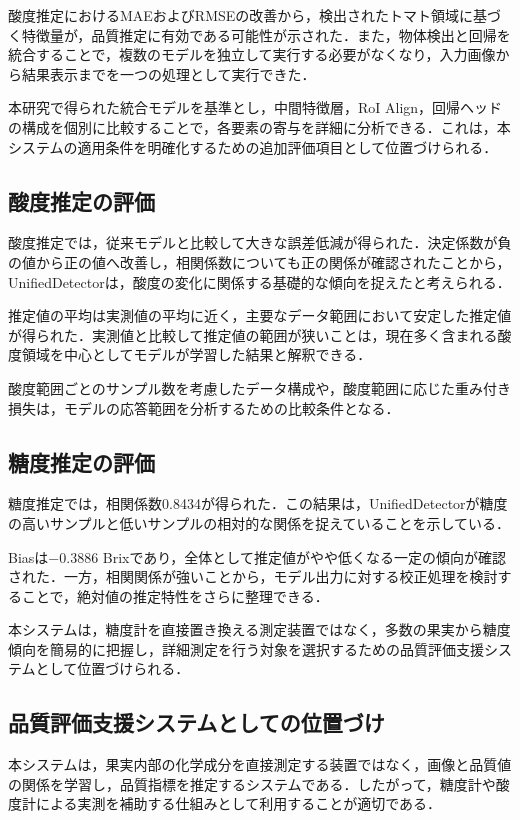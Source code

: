 \documentclass[authorproof,JRM,paper]{fujipressarticle}
\begin{document}
酸度推定におけるMAEおよびRMSEの改善から，検出されたトマト領域に基づく特徴量が，品質推定に有効である可能性が示された．また，物体検出と回帰を統合することで，複数のモデルを独立して実行する必要がなくなり，入力画像から結果表示までを一つの処理として実行できた．

本研究で得られた統合モデルを基準とし，中間特徴層，RoI Align，回帰ヘッドの構成を個別に比較することで，各要素の寄与を詳細に分析できる．これは，本システムの適用条件を明確化するための追加評価項目として位置づけられる．

\subsection{酸度推定の評価}

酸度推定では，従来モデルと比較して大きな誤差低減が得られた．決定係数が負の値から正の値へ改善し，相関係数についても正の関係が確認されたことから，UnifiedDetectorは，酸度の変化に関係する基礎的な傾向を捉えたと考えられる．

推定値の平均は実測値の平均に近く，主要なデータ範囲において安定した推定値が得られた．実測値と比較して推定値の範囲が狭いことは，現在多く含まれる酸度領域を中心としてモデルが学習した結果と解釈できる．

酸度範囲ごとのサンプル数を考慮したデータ構成や，酸度範囲に応じた重み付き損失は，モデルの応答範囲を分析するための比較条件となる．

\subsection{糖度推定の評価}

糖度推定では，相関係数0.8434が得られた．この結果は，UnifiedDetectorが糖度の高いサンプルと低いサンプルの相対的な関係を捉えていることを示している．

Biasは$-0.3886$ Brixであり，全体として推定値がやや低くなる一定の傾向が確認された．一方，相関関係が強いことから，モデル出力に対する校正処理を検討することで，絶対値の推定特性をさらに整理できる．

本システムは，糖度計を直接置き換える測定装置ではなく，多数の果実から糖度傾向を簡易的に把握し，詳細測定を行う対象を選択するための品質評価支援システムとして位置づけられる．

\subsection{品質評価支援システムとしての位置づけ}

本システムは，果実内部の化学成分を直接測定する装置ではなく，画像と品質値の関係を学習し，品質指標を推定するシステムである．したがって，糖度計や酸度計による実測を補助する仕組みとして利用することが適切である．
\end{document}
